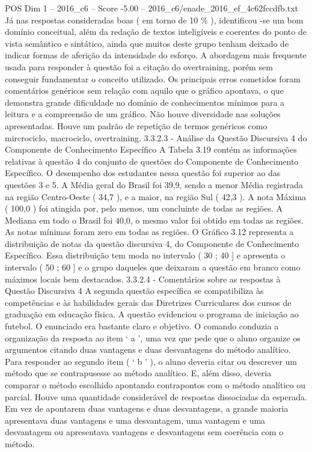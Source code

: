 \begin{textsample}{POS Dim 1 – 2016\_c6 – Score -5.00 – 2016\_c6/enade\_2016\_ef\_4c62fccdfb.txt}
Já nas respostas consideradas boas ( em torno de 10 \% ), identificou -se um bom domínio conceitual, além da redação de textos inteligíveis e coerentes do ponto de vista semântico e sintático, ainda que muitos deste grupo tenham deixado de indicar formas de aferição da intensidade do esforço.
A abordagem mais frequente usada para responder à questão foi a citação do overtraining, porém sem conseguir fundamentar o conceito utilizado.
Os principais erros cometidos foram comentários genéricos sem relação com aquilo que o gráfico apontava, o que demonstra grande dificuldade no domínio de conhecimentos mínimos para a leitura e a compreensão de um gráfico.
Não houve diversidade nas soluções apresentadas.
Houve um padrão de repetição de termos genéricos como mircrociclo, macrociclo, overtraining. 3.3.2.3 - Análise da Questão Discursiva 4 do Componente de Conhecimento Específico A Tabela 3.19 contém as informações relativas à questão 4 do conjunto de questões do Componente de Conhecimento Específico.
O desempenho dos estudantes nessa questão foi superior ao das questões 3 e 5.
A Média geral do Brasil foi 39,9, sendo a menor Média registrada na região Centro-Oeste ( 34,7 ), e a maior, na região Sul ( 42,3 ).
A nota Máxima ( 100,0 ) foi atingida por, pelo menos, um concluinte de todas as regiões.
A Mediana em todo o Brasil foi 40,0, o mesmo valor foi obtido em todas as regiões.
As notas mínimas foram zero em todas as regiões.
O Gráfico 3.12 representa a distribuição de notas da questão discursiva 4, do Componente de Conhecimento Específico.
Essa distribuição tem moda no intervalo ( 30 ; 40 ] e apresenta o intervalo ( 50 ; 60 ] e o grupo daqueles que deixaram a questão em branco como máximos locais bem destacados. 3.3.2.4 - Comentários sobre as respostas à Questão Discursiva 4 A segunda questão específica se compatibiliza às competências e às habilidades gerais das Diretrizes Curriculares dos cursos de graduação em educação física.
A questão evidenciou o programa de iniciação ao futebol.
O enunciado era bastante claro e objetivo.
O comando conduzia a organização da resposta ao item ‘ a ’, uma vez que pede que o aluno organize os argumentos citando duas vantagens e duas desvantagens do método analítico.
Para responder ao segundo item ( ‘ b ’ ), o aluno deveria citar ou descrever um método que se contrapusesse ao método analítico.
E, além disso, deveria comparar o método escolhido apontando contrapontos com o método analítico ou parcial.
Houve uma quantidade considerável de respostas dissociadas da esperada.
Em vez de apontarem duas vantagens e duas desvantagens, a grande maioria apresentava duas vantagens e uma desvantagem, uma vantagem e uma desvantagem ou apresentava vantagens e desvantagens sem coerência com o método.

\end{textsample}

